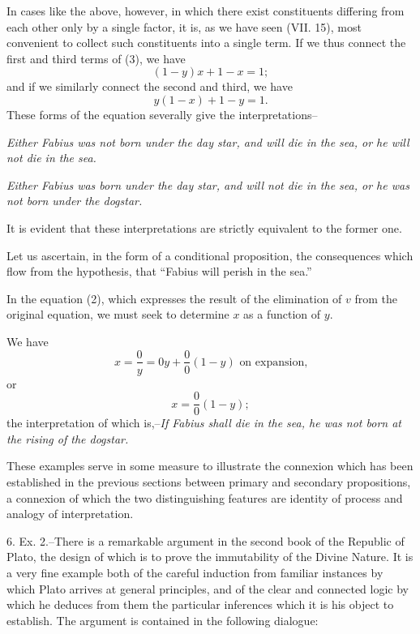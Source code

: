 \documentclass[oneside]{book}
\begin{document}
In cases like the above, however, in which there exist constituents differing from each other only by a single factor, it is, as
we have seen (VII. 15), most convenient to collect such constituents into a single term. If we thus connect the first and third
terms of (3), we have
\[
(1 - y)x + 1 - x = 1;
\]
and if we similarly connect the second and third, we have
\[
y(1-x)+1-y=1.
\]
These forms of the equation severally give the interpretations--

\textit{Either Fabius was not born under the day star, and will die in
the sea, or he will not die in the sea.}

\textit{Either Fabius was born under the day star, and will not die in
the sea, or he was not born under the dogstar.}

It is evident that these interpretations are strictly equivalent
to the former one.

Let us ascertain, in the form of a conditional proposition, the
consequences which flow from the hypothesis, that ``Fabius will
perish in the sea.''

In the equation (2), which expresses the result of the elimination
of $v$ from the original equation, we must seek to determine
$x$ as a function of $y$.

We have
\[
x = \frac{0}{y} = 0y+\frac{0}{0}(1-y)\textrm{ on expansion,}
\]
or
\[
x = \frac{0}{0}(1-y);
\]
the interpretation of which is,--\textit{If Fabius shall die in the sea, he
was not born at the rising of the dogstar.}

These examples serve in some measure to illustrate the connexion
which has been established in the previous sections between
primary and secondary propositions, a connexion of which
the two distinguishing features are identity of process and analogy
of interpretation.

6. Ex. 2.--There is a remarkable argument in the second
book of the Republic of Plato, the design of which is to prove
the immutability of the Divine Nature. It is a very fine example
both of the careful induction from familiar instances by which
Plato arrives at general principles, and of the clear and connected
logic by which he deduces from them the particular inferences
which it is his object to establish. The argument is contained
in the following dialogue:
\end{document}
